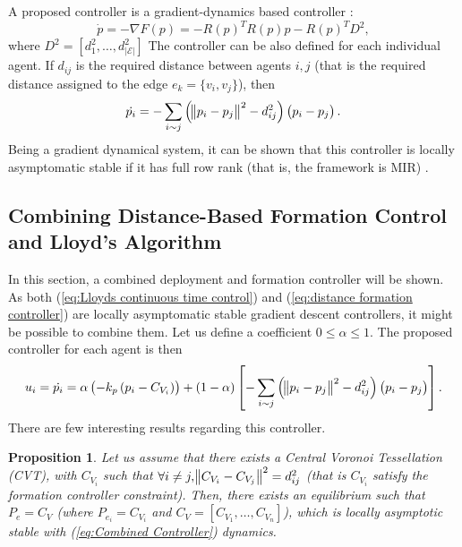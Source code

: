 \documentclass{iacas}
\newtheorem{proposition}{Proposition}
\begin{document}
A proposed controller is a gradient-dynamics based controller \cite{Kwang-KyoOh2011,Krick2008}:
\begin{equation}
\dot{p} = -\nabla F(p) = -R(p)^{T} R(p) p - R(p)^{T}D^2,
\label{eq:distance formation controller}
\end{equation}
where $D^2 = \left[d_1^2, \ldots, d_{|\mathcal{E}|}^2\right]$%
The controller can be also defined for each individual agent. If $d_{ij}$ is the required distance between agents $i,j$ (that is the required distance assigned to the edge $e_k = \{v_i, v_j\}$), then
\begin{equation}
    \dot{p_{i}} = -\sum_{i \sim j} \left( \norm{p_{i} - p_{j}}^{2} - d_{ij}^2 \right) \left( p_{i} - p_{j} \right).
    \label{eq:distance formation controller for individual agent}
\end{equation}
Being a gradient dynamical system, it can be shown that this controller is locally asymptomatic stable if it has full row rank (that is, the framework is MIR) \cite{Kwang-KyoOh2011,Krick2008}.

\subsection{Combining Distance-Based Formation Control and Lloyd's Algorithm}
In this section, a combined deployment and formation controller will be shown. As both (\ref{eq:Lloyds continuous time control}) and (\ref{eq:distance formation controller}) are locally asymptomatic stable gradient descent controllers, it might be possible to combine them. Let us define a coefficient $0 \leq \alpha \leq 1$. The proposed controller for each agent is then
\begin{equation}
    u_{i} = \dot{p_{i}} = \alpha \left(-k_{p}\left( p_i -C_{V_{i}} \right)\right) +
    \left( 1-\alpha \right)\left[-\sum_{i \sim j} \left( \norm{p_{i} - p_{j}}^{2} - d_{ij}^2 \right) \left( p_{i} - p_{j} \right)  \right].
    \label{eq:Combined Controller}
\end{equation}
There are few interesting results regarding this controller.

\begin{proposition}
    Let us assume that there exists a Central Voronoi Tessellation (CVT), with $C_{V_{i}}$ such that $\forall i \neq j, \norm{C_{V_{i}} - C_{V_{j}}}^{2} = d_{ij}^{2}$ (that is $C_{V_{i}}$ satisfy the formation controller constraint). Then, there exists an equilibrium such that $P_e = C_V$ (where $P_{e_i} = C_{V_{i}}$ and $C_V = \left[C_{V_1}, \ldots, C_{V_n} \right]$), which is locally asymptotic stable with (\ref{eq:Combined Controller}) dynamics.
    \label{proposition 1}
\end{proposition}
\end{document}
